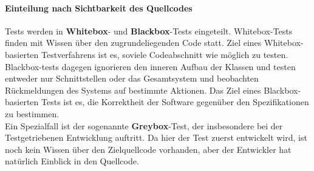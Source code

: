 \paragraph{Einteilung nach Sichtbarkeit des Quellcodes} Tests werden in \textbf{Whitebox}- und \textbf{Blackbox}-Tests eingeteilt.
Whitebox-Tests finden mit Wissen über den zugrundeliegenden Code statt. Ziel eines Whitebox-basierten Testverfahrens ist es, soviele Codeabschnitt wie möglich zu testen.\\
Blackbox-tests dagegen ignorieren den inneren Aufbau der Klassen und testen entweder nur Schnittstellen oder das Gesamtsystem und beobachten Rückmeldungen des Systems auf bestimmte Aktionen. Das Ziel eines Blackbox-basierten Tests ist es, die Korrektheit der Software gegenüber den Spezifikationen zu bestimmen.\\
Ein Spezialfall ist der sogenannte \textbf{Greybox}-Test, der insbesondere bei der Testgetriebenen Entwicklung auftritt. Da hier der Test zuerst entwickelt wird, ist noch kein Wissen über den Zielquellcode vorhanden, aber der Entwickler hat natürlich Einblick in den Quellcode.

